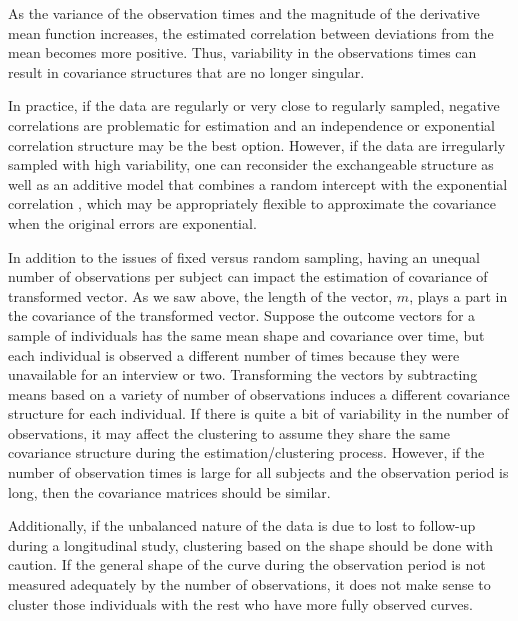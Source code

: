 As the variance of the observation times and the magnitude of the derivative mean function increases, the estimated correlation between deviations from the mean becomes more positive. Thus, variability in the observations times can result in covariance structures that are no longer singular. 

In practice, if the data are regularly or very close to regularly sampled, negative correlations are problematic for estimation and an independence or exponential correlation structure may be the best option. However, if the data are irregularly sampled with high variability, one can reconsider the exchangeable structure as well as an additive model that combines a random intercept with the exponential correlation \cite{diggle2002}, which may be appropriately flexible to approximate the covariance when the original errors are exponential.

In addition to the issues of fixed versus random sampling, having an unequal number of observations per subject can impact the estimation of covariance of transformed vector. As we saw above, the length of the vector, $m$, plays a part in the covariance of the transformed vector. Suppose the outcome vectors for a sample of individuals has the same mean shape and covariance over time, but each individual is observed a different number of times because they were unavailable for an interview or two. Transforming the vectors by subtracting means based on a variety of number of observations induces a different covariance structure for each individual. If there is quite a bit of variability in the number of observations, it may affect the clustering to assume they share the same covariance structure during the estimation/clustering process. However, if the number of observation times is large for all subjects and the observation period is long, then the covariance matrices should be similar. 

Additionally, if the unbalanced nature of the data is due to lost to follow-up during a longitudinal study, clustering based on the shape should be done with caution. If the general shape of the curve during the observation period is not measured adequately by the number of observations, it does not make sense to cluster those individuals with the rest who have more fully observed curves. 

